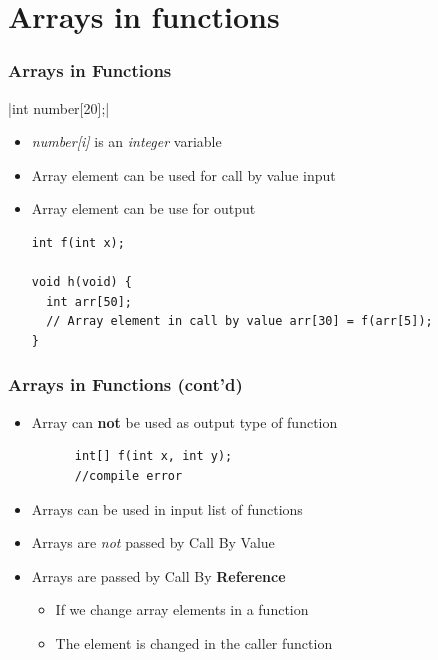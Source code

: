 \documentclass{../c-lecture}
\begin{document}
\section{Arrays in functions}

\begin{frame}[fragile]
  \frametitle{Arrays in Functions}
  |int number[20];|
  \begin{itemize}
    \item
      \textit{\color{LimeGreen} number[i]} is an
      \textit{\color{Orange} integer} variable

    \item Array element can be used for call by value input
    \item Array element can be use for output
    \begin{verbatim}
int f(int x);

void h(void) {
  int arr[50];
  // Array element in call by value arr[30] = f(arr[5]);
}
    \end{verbatim}
  \end{itemize}
\end{frame}

\begin{frame}[fragile]
  \frametitle{Arrays in Functions (cont’d)}
  \begin{itemize}
    \item
      Array can \textbf{\color{RubineRed} not} be used as output type of
      function

    \begin{verbatim}
      int[] f(int x, int y);
      //compile error
    \end{verbatim}
    \item Arrays can be used in input list of functions
    \item
      Arrays are \textit{\color{Orange} not} passed by Call By Value

    \item
      Arrays are passed by Call By \textbf{\color{LimeGreen} Reference}

    \begin{itemize}
      \item If we change array elements in a function
      \item The element is changed in the caller function
    \end{itemize}
  \end{itemize}
\end{frame}
\end{document}
